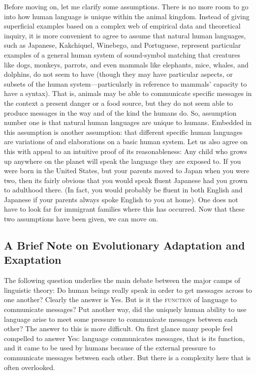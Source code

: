 \documentclass[11pt]{book}%
\theoremstyle{plain}
\numberwithin{equation}{section}
\theoremstyle{definition}
\newtheorem{phrase string}{Phrase String}
\begin{document}
Before moving on, let me clarify some assumptions. There is no more room to go into how human language is unique within the animal kingdom. Instead of giving superficial examples based on a complex web of empirical data and theoretical inquiry, it is more convenient to agree to assume that natural human languages, such as Japanese, Kakchiquel, Winebego, and Portuguese, represent particular examples of a general human system of sound-symbol matching that creatures like dogs, monkeys, parrots, and even mammals like elephants, mice, whales, and dolphins, do not seem to have (though they may have particular aspects, or subsets of the human system---particularly in reference to mammals' capacity to have a syntax). That is, animals may be able to communicate specific messages in the context a present danger or a food source, but they do not seem able to produce messages in the way and of the kind the humans do. So, assumption number one is that natural human languages are unique to humans. Embedded in this assumption is another assumption: that different specific human languages are variations of and elaborations on a basic human system. Let us also agree on this with appeal to an intuitive proof of its reasonableness: Any child who grows up anywhere on the planet will speak the language they are exposed to. If you were born in the United States, but your parents moved to Japan when you were two, then its fairly obvious that you would speak fluent Japanese had you grown to adulthood there. (In fact, you would probably be fluent in both English and Japanese if your parents always spoke English to you at home). One does not have to look far for immigrant families where this has occurred. Now that these two assumptions have been given, we can move on.
 
\subsection{A Brief Note on Evolutionary Adaptation and Exaptation}
The following question underlies the main debate between the major camps of linguistic theory: Do human beings really speak in order to get messages across to one another? Clearly the answer is Yes. But is it the \textsc{function} of language to communicate messages? Put another way, did the uniquely human ability to use language arise to meet some pressure to communicate messages between each other? The answer to this is more difficult. On first glance many people feel compelled to answer Yes: language communicates messages, that is its function, and it came to be used by humans because of the external pressure to communicate messages between each other. But there is a complexity here that is often overlooked.
\end{document}
